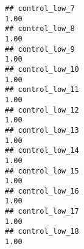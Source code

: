 \documentclass[
]{article}
\begin{document}
\begin{verbatim}
## control_low_7                                                                                                                                                                                                                1.00
## control_low_8                                                                                                                                                                                                                1.00
## control_low_9                                                                                                                                                                                                                1.00
## control_low_10                                                                                                                                                                                                               1.00
## control_low_11                                                                                                                                                                                                               1.00
## control_low_12                                                                                                                                                                                                               1.00
## control_low_13                                                                                                                                                                                                               1.00
## control_low_14                                                                                                                                                                                                               1.00
## control_low_15                                                                                                                                                                                                               1.00
## control_low_16                                                                                                                                                                                                               1.00
## control_low_17                                                                                                                                                                                                               1.00
## control_low_18                                                                                                                                                                                                               1.00

\end{verbatim}
\end{document}
